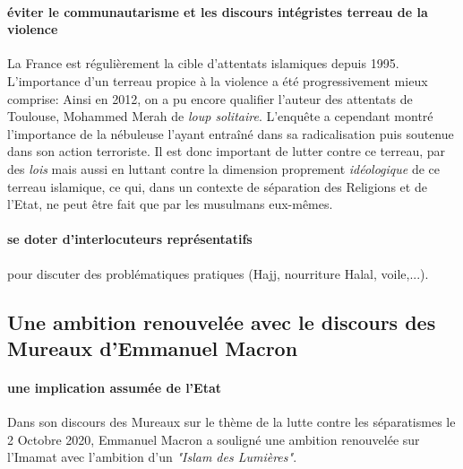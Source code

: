 \paragraph{éviter le communautarisme et les discours intégristes terreau de la violence} La France est régulièrement la cible d'attentats islamiques depuis 1995. L'importance d'un terreau propice à la violence a été progressivement mieux comprise: Ainsi en 2012, on a pu encore qualifier l'auteur des attentats de Toulouse, Mohammed Merah de \textit{loup solitaire}. L'enquête a cependant montré l'importance de la nébuleuse l'ayant entraîné dans sa radicalisation puis soutenue dans son action terroriste. Il est donc important de lutter contre ce terreau, par des \textit{lois} mais aussi en luttant contre la dimension proprement \textit{idéologique} de ce terreau islamique, ce qui, dans un contexte de séparation des Religions et de l'Etat, ne peut être fait que par les musulmans eux-mêmes. 
\paragraph{se doter d'{interlocuteurs représentatifs}}  pour discuter des problématiques pratiques (Hajj, nourriture Halal, voile,...).

\subsection*{Une ambition renouvelée avec le discours des Mureaux d'Emmanuel Macron}


\paragraph{une implication assumée de l'Etat}
Dans son discours des Mureaux sur le thème de la lutte contre les séparatismes le 2 Octobre 2020,  Emmanuel Macron a souligné une ambition renouvelée sur l'Imamat avec l'ambition d'un \textit{"Islam des Lumières"}.



